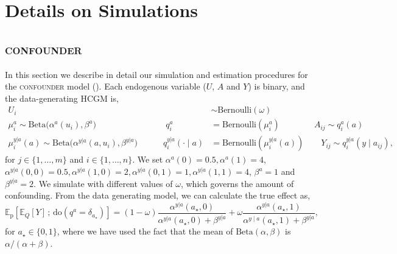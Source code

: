 \documentclass[12pt]{article}
\newcommand{\rmdo}{\mathrm{do}}
\newcommand{\s}{\, ; \,}
\newcommand{\pr}{\mathrm{p}}
\begin{document}
 
\section{Details on Simulations} \label{apx:simulations}


\subsection{\textsc{confounder}} \label{sec:unobs_conf_sim}

In this section we describe in detail our simulation and estimation procedures for the \textsc{confounder} model ().
Each endogenous variable ($U$, $A$ and $Y$) is binary, and the data-generating HCGM is,
\begin{equation*} \label{eqn:confound_dgm}
\begin{split}
U_i &\sim \mathrm{Bernoulli}(\omega)\\
\mu^{a}_i \sim \mathrm{Beta}\big(\alpha^{a}(u_i), \beta^a\big) \, \quad \quad \quad \quad \quad \quad \quad \quad  q^{a}_i & = \mathrm{Bernoulli}(\mu_i^{a})
\quad \quad \quad \quad A_{ij} \sim q^{a}_i(a) \\
\mu^{y|a}_i(a) \sim \mathrm{Beta}\big(\alpha^{y|a}(a, u_i), \beta^{y|a}\big) \quad \quad \quad  q^{y|a}_i(\cdot\mid a) & = \mathrm{Bernoulli}(\mu_i^{y|a}(a))
 \quad \quad Y_{ij} \sim q_i^{y|a}(y \mid a_{ij}),
\end{split}
\end{equation*}
for $j \in \{1, \ldots, m\}$ and $i \in \{1, \ldots, n\}$. We set $\alpha^{a}(0) = 0.5, \alpha^{a}(1) = 4$, $\alpha^{y|a}(0, 0) = 0.5, \alpha^{y|a}(1, 0) = 2, \alpha^{y|a}(0, 1) = 1, \alpha^{y|a}(1,1) = 4$, $\beta^a=1$ and $\beta^{y|a}=2$.
We simulate with different values of $\omega$, which governs the amount of confounding.
From the data generating model, we can calculate the true effect as,
\begin{equation*}
        \mathbb{E}_{\pr}[\mathbb{E}_Q[Y] \s \rmdo(q^{a} = \delta_{a_\star})] = (1-\omega) \frac{\alpha^{y | a}(a_\star,0)}{\alpha^{y | a}(a_\star,0) + \beta^{y|a}} + \omega \frac{\alpha^{y | a}(a_\star,1)}{\alpha^{y \mid a}(a_\star,1) + \beta^{y|a}},
\end{equation*}
for $a_\star \in \{0, 1\}$, where we have used the fact that the mean of $\mathrm{Beta}(\alpha, \beta)$ is  $\alpha/(\alpha + \beta)$.
\end{document}
